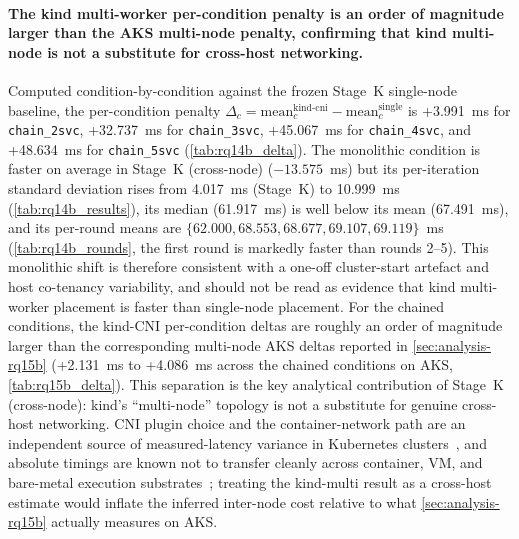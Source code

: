 \paragraph{The kind multi-worker per-condition penalty is an order of magnitude larger than the AKS multi-node penalty, confirming that kind multi-node is not a substitute for cross-host networking.}
Computed condition-by-condition against the frozen Stage~K single-node
baseline, the per-condition penalty
$\Delta_c = \mathrm{mean}_c^{\mathrm{kind\text{-}cni}} - \mathrm{mean}_c^{\mathrm{single}}$
is +3.991~ms for \texttt{chain\_2svc}, +32.737~ms for
\texttt{chain\_3svc}, +45.067~ms for \texttt{chain\_4svc}, and
+48.634~ms for \texttt{chain\_5svc} (\cref{tab:rq14b_delta}). The
monolithic condition is faster on average in Stage~K (cross-node) ($-13.575$~ms)
but its per-iteration standard deviation rises from 4.017~ms (Stage~K)
to 10.999~ms (\cref{tab:rq14b_results}), its median (61.917~ms) is
well below its mean (67.491~ms), and its per-round means are
$\{62.000, 68.553, 68.677, 69.107, 69.119\}$~ms (\cref{tab:rq14b_rounds},
the first round is markedly faster than rounds 2--5). This
monolithic shift is therefore consistent with a one-off cluster-start
artefact and host co-tenancy variability, and should not be read as
evidence that kind multi-worker placement is faster than single-node
placement. For the chained conditions, the kind-CNI per-condition
deltas are roughly an order of magnitude larger than the
corresponding multi-node AKS deltas reported in
\cref{sec:analysis-rq15b} (+2.131~ms to +4.086~ms across the chained
conditions on AKS, \cref{tab:rq15b_delta}). This separation is the
key analytical contribution of Stage~K (cross-node): kind's ``multi-node''
topology is not a substitute for genuine cross-host networking. CNI
plugin choice and the container-network path are an independent
source of measured-latency variance in Kubernetes
clusters~\cite{cni_k8s_ic2e21}, and absolute timings are known not
to transfer cleanly across container, VM, and bare-metal execution
substrates~\cite{virtualization_costs}; treating the kind-multi
result as a cross-host estimate would inflate the inferred
inter-node cost relative to what \cref{sec:analysis-rq15b} actually
measures on AKS.

